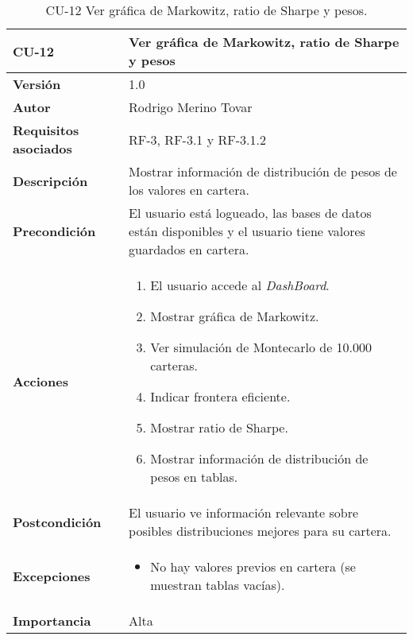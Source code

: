 \begin{table}[p]
	\centering
	\begin{tabularx}{\linewidth}{ p{} p{} }
		\toprule
		\textbf{CU-12}    & \textbf{Ver gráfica de Markowitz, ratio de Sharpe
y pesos}\\
		\toprule
		\textbf{Versión}              & 1.0    \\
		\textbf{Autor}                & Rodrigo Merino Tovar \\
		\textbf{Requisitos asociados} & RF-3, RF-3.1 y RF-3.1.2 \\
		\textbf{Descripción}          & Mostrar información de distribución de pesos de los valores en cartera.\\
		\textbf{Precondición}         & El usuario está logueado, las bases de datos están disponibles y el usuario tiene valores guardados en cartera.  \\
		\textbf{Acciones}             &
		\begin{enumerate}
			\def\labelenumi{\arabic{enumi}.}
			\tightlist
			\item El usuario accede al \emph{DashBoard}. 
			\item Mostrar gráfica de Markowitz.
			\item Ver simulación de Montecarlo de 10.000 carteras.  
			\item Indicar frontera eficiente. 
			\item Mostrar ratio de Sharpe. 
			\item Mostrar información de distribución de pesos en tablas.
		\end{enumerate}\\
		\textbf{Postcondición}        & El usuario ve información relevante sobre posibles distribuciones mejores para su cartera. \\
		\textbf{Excepciones}          & 
		\begin{itemize}
			\tightlist
			\item No hay valores previos en cartera (se muestran tablas vacías).
		\end{itemize} \\
		\textbf{Importancia}          & Alta \\
		\bottomrule
	\end{tabularx}
	\caption{CU-12 Ver gráfica de Markowitz, ratio de Sharpe y pesos.}
\end{table}


